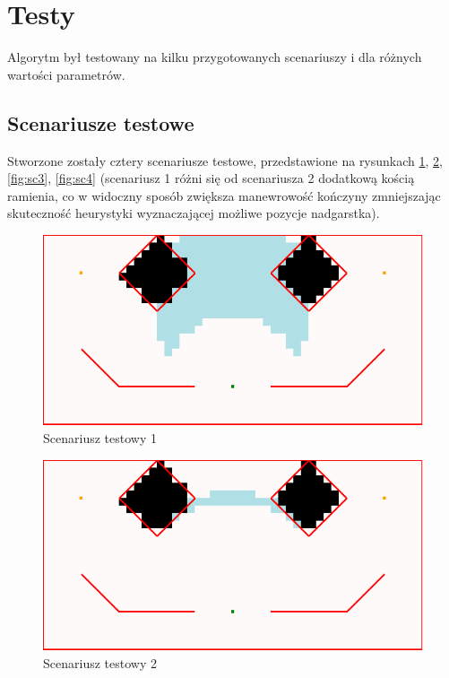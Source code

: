 \documentclass[11pt, leqno]{article}
\begin{document}
\section{Testy}

Algorytm był testowany na kilku przygotowanych scenariuszy i dla różnych wartości parametrów.

\subsection{Scenariusze testowe}
Stworzone zostały cztery scenariusze testowe, przedstawione na rysunkach \ref{fig:sc1}, \ref{fig:sc2}, \ref{fig:sc3}, \ref{fig:sc4} (scenariusz 1 różni się od scenariusza 2 dodatkową kością ramienia, co w widoczny sposób zwiększa manewrowość kończyny zmniejszając skuteczność heurystyki wyznaczającej możliwe pozycje nadgarstka).


\begin{figure}[h!]
	\centering
	\includegraphics[scale=0.4]{scenario1}
	\caption{Scenariusz testowy 1}
	\label{fig:sc1}
\end{figure}

\begin{figure}[h!]
	\centering
	\includegraphics[scale=0.4]{scenario2}
	\caption{Scenariusz testowy 2}
	\label{fig:sc2}
\end{figure}
\end{document}
